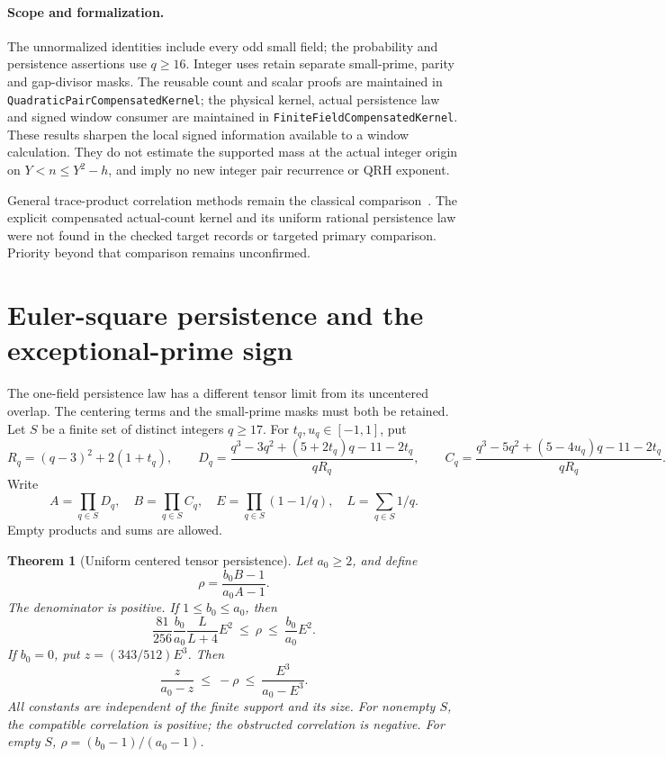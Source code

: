 \documentclass[11pt]{article}
\newtheorem{theorem}{Theorem}[section]
\begin{document}
\paragraph{Scope and formalization.}
The unnormalized identities include every odd small field; the probability
and persistence assertions use \(q\ge16\). Integer uses retain separate
small-prime, parity and gap-divisor masks. The reusable count and scalar
proofs are maintained in \texttt{QuadraticPairCompensatedKernel};
the physical kernel, actual persistence law and signed window consumer
are maintained in \texttt{FiniteFieldCompensatedKernel}.
These results sharpen the local signed information available to a
window calculation. They do not estimate the supported mass at the
actual integer origin on \(Y<n\le Y^2-h\), and imply no new integer
pair recurrence or QRH exponent.

General trace-product correlation methods remain the classical
comparison~\cite{FouvryKowalskiMichelProducts}. The explicit compensated
actual-count kernel and its uniform rational persistence law were not
found in the checked target records or targeted primary comparison.
Priority beyond that comparison remains unconfirmed.

\section{Euler-square persistence and the exceptional-prime sign}
\label{sec:tensor-persistence}

The one-field persistence law has a different tensor limit from its
uncentered overlap. The centering terms and the small-prime masks must
both be retained. Let \(S\) be a finite set of distinct integers \(q\ge17\).
For \(t_q,u_q\in[-1,1]\), put
\[
 R_q=(q-3)^2+2(1+t_q),\qquad
 D_q=\frac{q^3-3q^2+(5+2t_q)q-11-2t_q}{qR_q},\qquad
 C_q=\frac{q^3-5q^2+(5-4u_q)q-11-2t_q}{qR_q}.
\]
Write
\[
 A=\prod_{q\in S}D_q,\quad B=\prod_{q\in S}C_q,\quad
 E=\prod_{q\in S}(1-1/q),\quad L=\sum_{q\in S}1/q .
\]
Empty products and sums are allowed.

\begin{theorem}[Uniform centered tensor persistence]
\label{thm:tensor-persistence}
Let \(a_0\ge2\), and define
\[
 \rho=\frac{b_0B-1}{a_0A-1}.
\]
The denominator is positive. If \(1\le b_0\le a_0\), then
\begin{equation}
 \frac{81}{256}\frac{b_0}{a_0}\frac{L}{L+4}E^2
 \ \le\ \rho\ \le\ \frac{b_0}{a_0}E^2 .
 \label{eq:tensor-compatible}
\end{equation}
If \(b_0=0\), put \(z=(343/512)E^3\). Then
\begin{equation}
 \frac{z}{a_0-z}\ \le\ -\rho\
       \le\ \frac{E^3}{a_0-E^3}.
 \label{eq:tensor-obstructed}
\end{equation}
All constants are independent of the finite support and its size.
For nonempty \(S\), the compatible correlation is positive; the obstructed
correlation is negative. For empty \(S\), \(\rho=(b_0-1)/(a_0-1)\).
\end{theorem}
\end{document}
